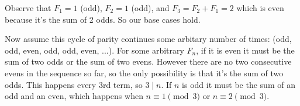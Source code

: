 \documentclass{article}
\begin{document}
Observe that $F_1 = 1$ (odd), $F_2 = 1$ (odd), and $F_3 = F_2 + F_1 = 2$ which is even because it's the sum of 2 odds. So our base cases hold.

Now assume this cycle of parity continues some arbitary number of times: (odd, odd, even, odd, odd, even, ...). For some arbitrary $F_n$, if it is even it must be the sum of two odds or the sum of two evens. However there are no two consecutive evens in the sequence so far, so the only possibility is that it's the sum of two odds. This happens every 3rd term, so $3 \mid n$. If $n$ is odd it must be the sum of an odd and an even, which happens when $n \equiv 1 \pmod{3}$ or $n \equiv 2 \pmod{3}$.
\end{document}
